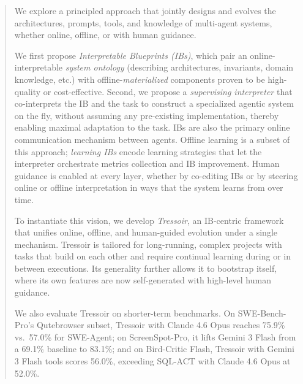 \begin{abstract}
We explore a principled approach that jointly designs and evolves the architectures, prompts, tools, and knowledge of multi-agent systems, whether online, offline, or with human guidance.

We first propose \textit{Interpretable Blueprints (IBs)}, which pair an online-interpretable \textit{system ontology} (describing architectures, invariants, domain knowledge, etc.) with offline-\textit{materialized} components proven to be high-quality or cost-effective.
Second, we propose a \textit{supervising interpreter} that co-interprets the IB and the task to construct a specialized agentic system on the fly, without assuming any pre-existing implementation, thereby enabling maximal adaptation to the task.
IBs are also the primary online communication mechanism between agents.
Offline learning is a subset of this approach; \textit{learning IBs} encode learning strategies that let the interpreter orchestrate metrics collection and IB improvement.
Human guidance is enabled at every layer, whether by co-editing IBs or by steering online or offline interpretation in ways that the system learns from over time.

To instantiate this vision, we develop \textit{Tressoir}, an IB-centric framework that unifies online, offline, and human-guided evolution under a single mechanism. Tressoir is tailored for long-running, complex projects with tasks that build on each other and require continual learning during or in between executions. Its generality further allows it to bootstrap itself, where its own features are now self-generated with high-level human guidance.

We also evaluate Tressoir on shorter-term benchmarks. On SWE-Bench-Pro's Qutebrowser subset, Tressoir with Claude 4.6 Opus reaches 75.9\% vs.\ 57.0\% for SWE-Agent; on ScreenSpot-Pro, it lifts Gemini 3 Flash from a 69.1\% baseline to 83.1\%; and on Bird-Critic Flash, Tressoir with Gemini 3 Flash tools scores 56.0\%, exceeding SQL-ACT with Claude 4.6 Opus at 52.0\%.
\end{abstract}